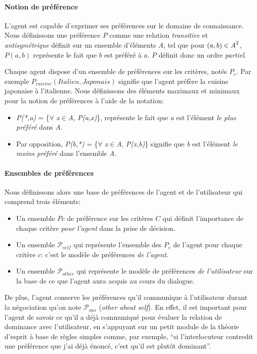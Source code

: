 \documentclass [french]{sig-alternate-05-2015}
\begin{document}
\paragraph{Notion de préférence}
L'agent est capable d'exprimer ses préférences sur le domaine de connaissance. Nous définissons une préférence $P$ comme une relation \emph{transitive} et \emph{antisymétrique} définit sur un ensemble d'éléments \emph{A}, tel que pour $(a,b) \in \emph{A}^2$, $P(a,b)$ représente le fait que $b$  est préféré à $a$. $P$ définit donc un ordre \emph{partiel}.

Chaque agent dispose d'un ensemble de préférences sur les critères, notés $P_c$. Par exemple $P_{cuisine} (Italien, Japonais)$ signifie que l'agent préfère la cuisine japonaise à l'italienne. Nous définissons des éléments maximaux et minimaux pour la notion de préférences à l'aide de la notation:
\begin{itemize}
	\item  \emph{P(*,a)}  = \{$\forall$ \emph{x}$\in$\emph{A}, \emph{P(a,x)}\}, représente le fait que  \emph{a} est l'élément  \textit{le plus préféré} dans \emph{A}.
	\item Par opposition, \emph{P(b,*)} = \{$\forall$ \emph{x}$\in$\emph{A}, \emph{P(x,b)}\} signifie que \emph{b} est l'élément \textit{le moins préféré} dans l'ensemble \emph{A}. 
\end{itemize}

\paragraph{Ensembles de préférences}
Nous définissons alors une base de préférences de l'agent et de l'utilisateur qui comprend trois éléments:
\begin{itemize}
	\item Un ensemble $Pc$ de préférence sur les critères $C$ qui définit l'importance de chaque critère \emph{pour l'agent} dans la prise de décision.
	\item Un ensemble $\mathcal{P}_{self}$ qui représente l'ensemble des $P_c$ de l'agent pour chaque critère $c$: c'est le modèle de préférences \emph{de l'agent}.
	\item Un ensemble $\mathcal{P}_{other}$ qui représente le modèle de préférences \emph{de l'utilisateur} sur la base de ce que l'agent aura acquis au cours du dialogue.
\end{itemize}

De plus, l'agent conserve les préférences qu'il communique à l'utilisateur durant la négociation qu'on note $\mathcal{P}_{oas}$ (\textit{other about self}). En effet, il est important pour l'agent de savoir ce qu'il a déjà communiqué pour évaluer la relation de dominance avec l'utilisateur, en s'appuyant sur un petit module de la théorie d'esprit à base de règles simples comme, par exemple, ``si l'interlocuteur contredit une préférence que j'ai déjà énoncé, c'est qu'il est plutôt dominant''.
\end{document}
